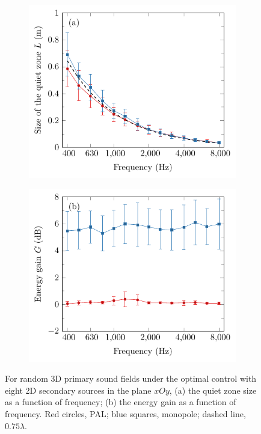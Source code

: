 \begin{figure}[!htb]
    \centering
    \begin{subfigure}{0.49\textwidth}
        \centering
        \includegraphics[width = \textwidth]{fig/200405A_size_v2}
    \end{subfigure}
    \begin{subfigure}{0.49\textwidth}
        \centering
        \includegraphics[width = \textwidth]{fig/200405A_gain_v2}
    \end{subfigure}
    \caption{For random 3D primary sound fields under the optimal control with eight 2D secondary sources in the plane $xOy$, (a) the quiet zone size as a function of frequency; (b) the energy gain as a function of frequency. Red circles, PAL; blue squares, monopole; dashed line, $0.75\lambda$.}
    \label{fig:ancpalqz:qz_eg:rand:2d2}
\end{figure}

